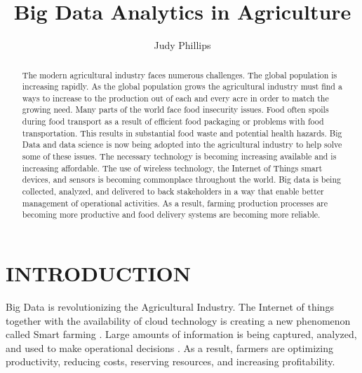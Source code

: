 \documentclass[sigconf]{acmart}
\begin{document}
\title{Big Data Analytics in Agriculture}


\author{Judy Phillips}

\renewcommand{\shortauthors}{B. Trovato et al.}


\begin{abstract}
The modern agricultural industry faces numerous challenges. The global population is increasing rapidly. As the global population grows the agricultural industry must find a ways to increase to the production out of each and every acre in order to match the growing need.  Many parts of the world face food insecurity issues. Food often spoils during food transport as a result of efficient food packaging or problems with food transportation. This results in substantial food waste and potential health hazards. Big Data and data science is now being adopted into the agricultural industry to help solve some of these issues. The necessary technology is becoming increasing available and is increasing affordable. The use of wireless technology, the Internet of Things smart devices, and sensors is becoming commonplace throughout the world. Big data is being collected, analyzed, and delivered to back stakeholders in a way that enable better management of operational activities. As a result, farming production processes are becoming more productive and food delivery systems are becoming more reliable.
\end{abstract}



\maketitle

\section{INTRODUCTION}

Big Data is revolutionizing the Agricultural Industry. The Internet of things together with the availability of cloud technology is creating a new phenomenon called Smart farming \cite{Wolfert}. Large amounts of information is being captured, analyzed, and used to make operational decisions  \cite{DevEcon}.  As a result, farmers are optimizing productivity, reducing costs, reserving resources, and increasing profitability. 
\end{document}
